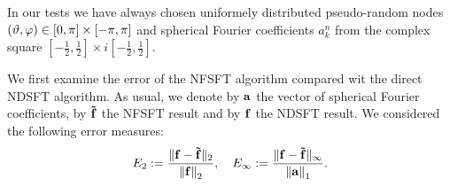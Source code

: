 In our tests we have always chosen uniformely distributed pseudo-random 
nodes $\left(\vartheta,\varphi\right) \in [0,\pi] \times [-\pi,\pi]$ and 
spherical Fourier coefficients $a_{k}^n$ from the complex square
$\left[-\frac{1}{2},\frac{1}{2}\right] \times 
i\left[-\frac{1}{2},\frac{1}{2}\right]$.

We first examine the error of the NFSFT algorithm compared wit the direct NDSFT
algorithm. As usual, we denote by $\mathbf{a}$ the vector of
spherical Fourier coefficients, by $\mathbf{\tilde{f}}$ the NFSFT result and
by $\mathbf{f}$ the NDSFT result. We considered the following error measures:
\begin{align*}
  E_{2} := \frac{\|\mathbf{f}-\mathbf{\tilde{f}}\|_{2}}{\left\|\mathbf{f}\right\|_{2}}, \quad
  E_{\infty} := \frac{\|\mathbf{f}-\mathbf{\tilde{f}}\|_{\infty}}{\left\|\mathbf{a}\right\|_{1}}.
\end{align*}


